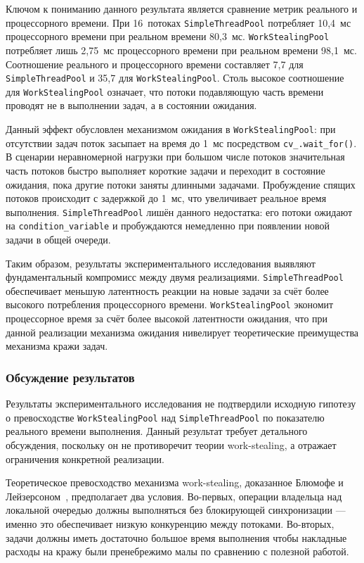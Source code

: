 Ключом к пониманию данного результата является сравнение
метрик реального и процессорного времени. При 16~потоках
\texttt{SimpleThreadPool} потребляет 10,4~мс процессорного
времени при реальном времени 80,3~мс. \texttt{WorkStealingPool}
потребляет лишь 2,75~мс процессорного времени при реальном
времени 98,1~мс. Соотношение реального и процессорного времени
составляет 7,7 для \texttt{SimpleThreadPool} и 35,7 для
\texttt{WorkStealingPool}. Столь высокое соотношение для
\texttt{WorkStealingPool} означает, что потоки подавляющую
часть времени проводят не в выполнении задач, а в состоянии
ожидания.

Данный эффект обусловлен механизмом ожидания в
\texttt{WorkStealingPool}: при отсутствии задач поток засыпает
на время до 1~мс посредством \texttt{cv\_.wait\_for()}.
В сценарии неравномерной нагрузки при большом числе потоков
значительная часть потоков быстро выполняет короткие задачи
и переходит в состояние ожидания, пока другие потоки заняты
длинными задачами. Пробуждение спящих потоков происходит
с задержкой до 1~мс, что увеличивает реальное время выполнения.
\texttt{SimpleThreadPool} лишён данного недостатка: его потоки
ожидают на \texttt{condition\_variable} и пробуждаются
немедленно при появлении новой задачи в общей очереди.

Таким образом, результаты экспериментального исследования
выявляют фундаментальный компромисс между двумя реализациями.
\texttt{SimpleThreadPool} обеспечивает меньшую латентность
реакции на новые задачи за счёт более высокого потребления
процессорного времени. \texttt{WorkStealingPool} экономит
процессорное время за счёт более высокой латентности ожидания,
что при данной реализации механизма ожидания нивелирует
теоретические преимущества механизма кражи задач.

\subsubsection{Обсуждение результатов}

Результаты экспериментального исследования не подтвердили
исходную гипотезу о превосходстве \texttt{WorkStealingPool}
над \texttt{SimpleThreadPool} по показателю реального времени
выполнения. Данный результат требует детального обсуждения,
поскольку он не противоречит теории work-stealing, а отражает
ограничения конкретной реализации.

Теоретическое превосходство механизма work-stealing, доказанное
Блюмофе и Лейзерсоном~\cite{Blumofe1999}, предполагает два
условия. Во-первых, операции владельца над локальной очередью
должны выполняться без блокирующей синхронизации --- именно
это обеспечивает низкую конкуренцию между потоками. Во-вторых,
задачи должны иметь достаточно большое время выполнения чтобы
накладные расходы на кражу были пренебрежимо малы по сравнению
с полезной работой.

